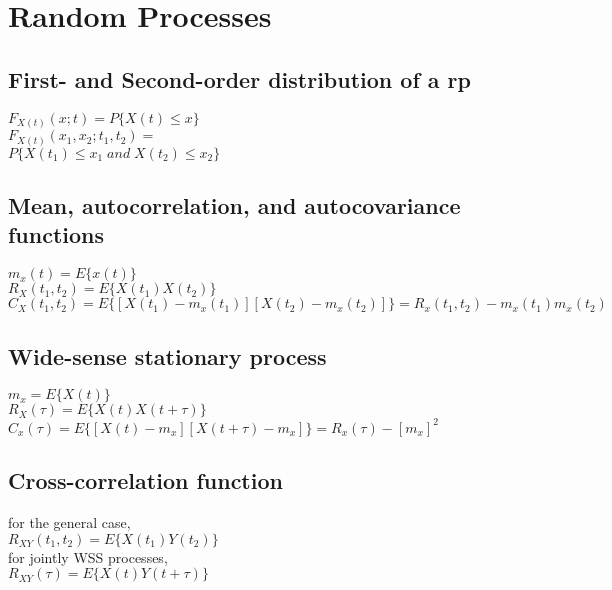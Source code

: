 \section*{Random Processes}

\subsection*{First- and Second-order distribution of a rp} 
$F_{X(t)}(x;t)=P\{X(t) \leq x\}$ \\
$F_{X(t)}(x_1,x_2;t_1,t_2)=$ \\ $P\{X(t_1)\leq x_1 \; and \; X(t_2) \leq x_2\}$

\subsection*{Mean, autocorrelation, and autocovariance functions}
$m_x(t)=E\{x(t)\}$ \\
$R_X(t_1,t_2)=E\{X(t_1)X(t_2)\}$ \\
$C_X(t_1,t_2)=E\{[X(t_1)-m_x(t_1)][X(t_2)-m_x(t_2)]\}=R_x(t_1,t_2)-m_x(t_1)m_x(t_2)$

\subsection*{Wide-sense stationary process}
$m_x=E\{X(t)\} $\\
$R_X(\tau)=E\{X(t)X(t+\tau)\}$ \\
$C_x(\tau) =E\{[X(t)-m_x] [X(t+\tau)-m_x]\}= R_x(\tau)-{[m_x]} ^2$ 

\subsection*{Cross-correlation function}
for the general case, \\
$R_{XY}(t_1,t_2)=E\{X(t_1)Y(t_2)\}$ \\
for jointly WSS processes, \\
$R_{XY}(\tau)=E\{X(t)Y(t+\tau)\}$
